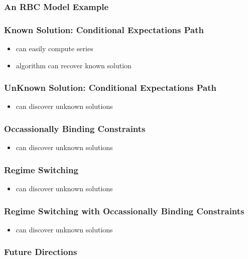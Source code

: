 \documentclass[tikz]{beamer}
\begin{document}
\begin{frame}
\frametitle{An RBC Model Example}
\end{frame}
\begin{frame}
\frametitle{Known Solution: Conditional Expectations Path}
\begin{itemize}
\item can easily compute series
\item algorithm can recover known solution
\end{itemize}


\end{frame}




\begin{frame}
\frametitle{UnKnown Solution: Conditional Expectations Path}
\begin{itemize}
\item can discover unknown solutions
\end{itemize}



\end{frame}



\begin{frame}
\frametitle{Occassionally Binding Constraints}
\begin{itemize}
\item can discover unknown solutions
\end{itemize}



\end{frame}


\begin{frame}
\frametitle{Regime Switching}
\begin{itemize}
\item can discover unknown solutions
\end{itemize}


\end{frame}

\begin{frame}
\frametitle{Regime Switching with Occassionally Binding Constraints}
\begin{itemize}
\item can discover unknown solutions
\end{itemize}

\end{frame}
\begin{frame}
\frametitle{Future Directions}
\end{frame}
\end{document}
